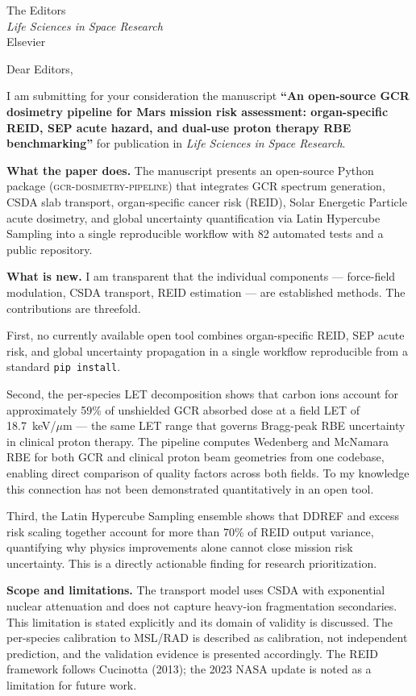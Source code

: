 \documentclass[11pt,letterpaper]{letter}
\date{\today}
\begin{document}
\begin{letter}{The Editors\\
  \textit{Life Sciences in Space Research}\\
  Elsevier}

\opening{Dear Editors,}

I am submitting for your consideration the manuscript
\textbf{``An open-source GCR dosimetry pipeline for Mars mission risk
assessment: organ-specific REID, SEP acute hazard, and dual-use proton
therapy RBE benchmarking''} for publication in \textit{Life Sciences in
Space Research}.

\medskip
\textbf{What the paper does.}
The manuscript presents an open-source Python package
(\textsc{gcr-dosimetry-pipeline}) that integrates GCR spectrum
generation, CSDA slab transport, organ-specific cancer risk (REID),
Solar Energetic Particle acute dosimetry, and global uncertainty
quantification via Latin Hypercube Sampling into a single reproducible
workflow with 82 automated tests and a public repository.

\medskip
\textbf{What is new.}
I am transparent that the individual components — force-field
modulation, CSDA transport, REID estimation — are established methods.
The contributions are threefold.

First, no currently available open tool combines organ-specific REID,
SEP acute risk, and global uncertainty propagation in a single workflow
reproducible from a standard \texttt{pip install}.

Second, the per-species LET decomposition shows that carbon ions account
for approximately 59\% of unshielded GCR absorbed dose at a field LET
of 18.7~keV/$\mu$m — the same LET range that governs Bragg-peak RBE
uncertainty in clinical proton therapy.
The pipeline computes Wedenberg and McNamara RBE for both GCR and
clinical proton beam geometries from one codebase, enabling direct
comparison of quality factors across both fields.
To my knowledge this connection has not been demonstrated quantitatively
in an open tool.

Third, the Latin Hypercube Sampling ensemble shows that DDREF and excess
risk scaling together account for more than 70\% of REID output variance,
quantifying why physics improvements alone cannot close mission risk
uncertainty. This is a directly actionable finding for research
prioritization.

\medskip
\textbf{Scope and limitations.}
The transport model uses CSDA with exponential nuclear attenuation and
does not capture heavy-ion fragmentation secondaries.
This limitation is stated explicitly and its domain of validity is
discussed.
The per-species calibration to MSL/RAD is described as calibration, not
independent prediction, and the validation evidence is presented
accordingly.
The REID framework follows Cucinotta (2013); the 2023 NASA update is
noted as a limitation for future work.


\end{letter}
\end{document}
